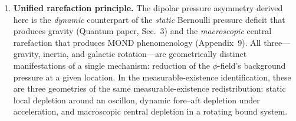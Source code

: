 \documentclass[11pt]{article}
\begin{document}
\begin{enumerate}
\item \textbf{Unified rarefaction principle.}
  The dipolar pressure asymmetry derived here is the
  \emph{dynamic} counterpart of the \emph{static}
  Bernoulli pressure deficit that produces gravity
  (Quantum paper, Sec.~3) and the \emph{macroscopic}
  central rarefaction that produces MOND
  phenomenology (Appendix~9).  All three---gravity,
  inertia, and galactic rotation---are geometrically
  distinct manifestations of a single mechanism:
  reduction of the $\phi$-field's background pressure
  at a given location.  In the measurable-existence identification,
  these are three geometries of the same measurable-existence
  redistribution: static local depletion around an oscillon,
  dynamic fore--aft depletion under acceleration, and
  macroscopic central depletion in a rotating bound system.
\end{enumerate}
\end{document}

